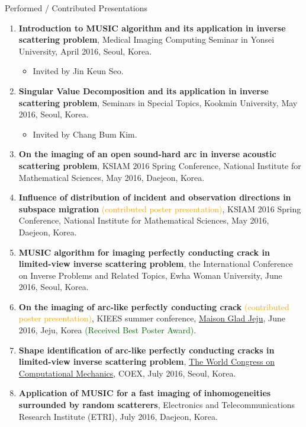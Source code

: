 \documentclass{resume} %
\begin{document}
\begin{rSection}{Performed / Contributed Presentations}
\begin{enumerate}
\item\label{P-MICS2016} \textbf{Introduction to MUSIC algorithm and its application in inverse scattering problem}, Medical Imaging Computing Seminar in Yonsei University, April 2016, Seoul, Korea.
\begin{itemize}
\item Invited by Jin Keun Seo.
\end{itemize}
\item\label{P-KMU2016} \textbf{Singular Value Decomposition and its application in inverse scattering problem}, Seminars in Special Topics, Kookmin University, May 2016, Seoul, Korea.
\begin{itemize}
\item Invited by Chang Bum Kim.
\end{itemize}
\item\label{P-KSIAM2016A} \textbf{On the imaging of an open sound-hard arc in inverse acoustic scattering problem}, KSIAM 2016 Spring Conference, National Institute for Mathematical Sciences, May 2016, Daejeon, Korea.
\item\label{P-KSIAM2016B} \textbf{Influence of distribution of incident and observation directions in subspace migration} \textcolor{orange}{(contributed poster presentation)}, KSIAM 2016 Spring Conference, National Institute for Mathematical Sciences, May 2016, Daejeon, Korea.
\item\label{P-ICIP2016} \textbf{MUSIC algorithm for imaging perfectly conducting crack in limited-view inverse scattering problem}, the  International Conference on Inverse Problems and Related Topics, Ewha Woman University, June 2016, Seoul, Korea.
\item\label{P-KIEES2016} \textbf{On the imaging of arc-like perfectly conducting crack} \textcolor{orange}{(contributed poster presentation)}, KIEES summer conference, \href{https://ora.oraresort.com/kor/GRD/index.php?}{Maison Glad Jeju}, June 2016, Jeju, Korea \textcolor{darkgreen}{(Received Best Poster Award)}.
\item\label{P-WCCM2016} \textbf{Shape identification of arc-like perfectly conducting cracks in limited-view inverse scattering problem}, \href{http://www.wccm2016.org/main/}{The  World Congress on Computational Mechanics}, COEX, July 2016, Seoul, Korea.
\item\label{P-ETRI2016} \textbf{Application of MUSIC for a fast imaging of  inhomogeneities surrounded by random scatterers}, Electronics and Telecommunications Research Institute (ETRI), July 2016, Daejeon, Korea.

\end{enumerate}
\end{rSection}
\end{document}
